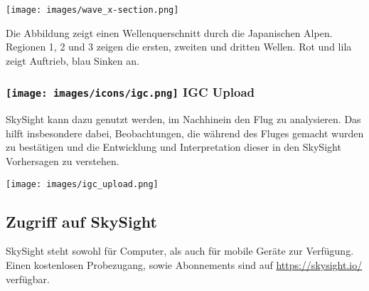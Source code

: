 \documentclass[9pt,a4paper,twocolumn]{article}
\begin{document}
\texttt{[image: images/wave\_x-section.png]}

Die Abbildung zeigt einen Wellenquerschnitt durch die Japanischen Alpen. Regionen 1, 2 und 3 zeigen die ersten, zweiten und dritten Wellen. Rot und lila zeigt Auftrieb, blau Sinken an.


\subsubsection*{\texttt{[image: images/icons/igc.png]} IGC Upload}
SkySight kann dazu genutzt werden, im Nachhinein den Flug zu analysieren. Das hilft insbesondere dabei, Beobachtungen, die während des Fluges gemacht wurden zu bestätigen und die Entwicklung und Interpretation dieser in den SkySight Vorhersagen zu verstehen.

\texttt{[image: images/igc\_upload.png]}

\subsection*{Zugriff auf SkySight}
SkySight steht sowohl für Computer, als auch für mobile Geräte zur Verfügung. Einen kostenlosen Probezugang, sowie Abonnements sind auf \url{https://skysight.io/} verfügbar.
\end{document}
